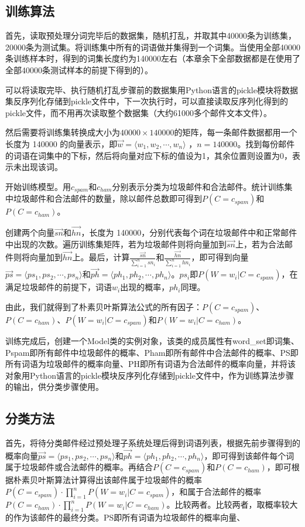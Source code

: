 \documentclass[UTF8,zihao=-4]{ctexart}
\begin{document}
\subsection{训练算法}
	首先，读取预处理分词完毕后的数据集，随机打乱，并取其中40000条为训练集，20000条为测试集。将训练集中所有的词语做并集得到一个词集。当使用全部40000条训练样本时，得到的词集长度约为140000左右（本章余下全部数据都是在使用了全部40000条测试样本的前提下得到的）。
	
	可以将读取完毕、执行随机打乱步骤前的数据集用Python语言的pickle模块将数据集反序列化存储到pickle文件中，下一次执行时，可以直接读取反序列化得到的pickle文件，而不用再次读取整个数据集（大约61000多个邮件文本文件）。
	
	然后需要将训练集转换成大小为$40000 \times 140000$的矩阵，每一条邮件数据都用一个长度为 140000 的向量表示，即$\vec{w}=\langle w_1,w_2, \cdots ,w_n\rangle$ ，$n=140000$。找到每份邮件的词语在词集中的下标，然后将向量对应下标的值设为1，其余位置则设置为0，表示未出现该词。
	
	
	开始训练模型。用$c_{spam}$和$c_{ham}$分别表示分类为垃圾邮件和合法邮件。统计训练集中垃圾邮件和合法邮件的数量，除以邮件总数即可得到$P(C=c_{spam})$和$P(C=c_{ham})$。
	
	创建两个向量$\vec{sn}$和$\vec{hn}$，长度为 140000，分别代表每个词在垃圾邮件中和正常邮件中出现的次数。遍历训练集矩阵，若为垃圾邮件则将向量加到$\vec{sn}$上，若为合法邮件则将向量加到$\vec{hn}$上。最后，计算$\frac{\vec{sn}}{\sum_{i=1}^{n}sn_i}$和$\frac{\vec{hn}}{\sum_{i=1}^{n}hn_i}$，即可得到向量$\vec{ps}=\langle ps_1,ps_2,\cdots,ps_n\rangle$和$\vec{ph}=\langle ph_1,ph_2,\cdots,ph_n\rangle$。$ps_i$即$P(W=w_i|C=c_{spam})$，在满足垃圾邮件的前提下，词语$w_i$出现的概率，$ph_i$同理。
	
	由此，我们就得到了朴素贝叶斯算法公式的所有因子：$P(C=c_{spam})$、$P(C=c_{ham})$、$P(W=w_i|C=c_{spam})$和$P(W=w_i|C=c_{ham})$。
	
	训练完成后，创建一个Model类的实例对象，该类的成员属性有word\_set即词集、Pspam即所有邮件中垃圾邮件的概率、Pham即所有邮件中合法邮件的概率、PS即所有词语为垃圾邮件的概率向量、PH即所有词语为合法邮件的概率向量，并将该对象用Python语言的pickle模块反序列化存储到pickle文件中，作为训练算法步骤的输出，供分类步骤使用。
	
\subsection{分类方法}
	首先，将待分类邮件经过预处理子系统处理后得到词语列表，根据先前步骤得到的概率向量$\vec{ps}=\langle ps_1,ps_2,\cdots,ps_n\rangle$和$\vec{ph}=\langle ph_1,ph_2,\cdots,ph_n\rangle$，即可得到该邮件每个词属于垃圾邮件或合法邮件的概率。再结合$P(C=c_{spam})$和$P(C=c_{ham})$，即可根据朴素贝叶斯算法计算得出该邮件属于垃圾邮件的概率$P(C=c_{spam}) \cdot \prod\limits_{i=1}^{n} P(W=w_i|C=c_{spam})$，和属于合法邮件的概率$P(C=c_{ham}) \cdot \prod\limits_{i=1}^{n} P(W=w_i|C=c_{ham})$。比较两者。比较两者，取概率较大的作为该邮件的最终分类。PS即所有词语为垃圾邮件的概率向量、
	
\end{document}
